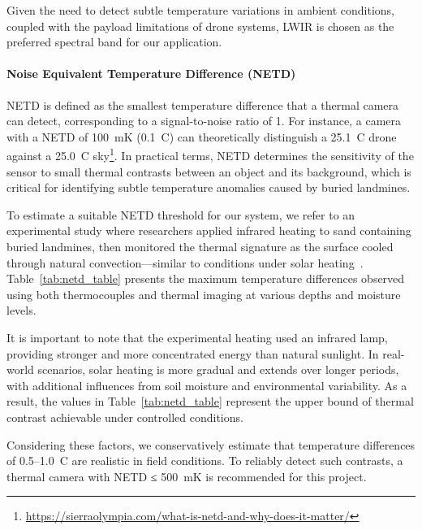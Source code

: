 Given the need to detect subtle temperature variations in ambient conditions, coupled with the payload limitations of drone systems, LWIR is chosen as the preferred spectral band for our application.


\paragraph{Noise Equivalent Temperature Difference (NETD)}

NETD is defined as the smallest temperature difference that a thermal camera can detect, corresponding to a signal-to-noise ratio of 1. For instance, a camera with a NETD of 100~mK (0.1~\textdegree C) can theoretically distinguish a 25.1~\textdegree C drone against a 25.0~\textdegree C sky\footnote{\url{https://sierraolympia.com/what-is-netd-and-why-does-it-matter/}}. In practical terms, NETD determines the sensitivity of the sensor to small thermal contrasts between an object and its background, which is critical for identifying subtle temperature anomalies caused by buried landmines.

To estimate a suitable NETD threshold for our system, we refer to an experimental study where researchers applied infrared heating to sand containing buried landmines, then monitored the thermal signature as the surface cooled through natural convection—similar to conditions under solar heating~\cite{lamorski2002thermal}. Table~\ref{tab:netd_table} presents the maximum temperature differences observed using both thermocouples and thermal imaging at various depths and moisture levels.

It is important to note that the experimental heating used an infrared lamp, providing stronger and more concentrated energy than natural sunlight. In real-world scenarios, solar heating is more gradual and extends over longer periods, with additional influences from soil moisture and environmental variability. As a result, the values in Table~\ref{tab:netd_table} represent the upper bound of thermal contrast achievable under controlled conditions.

Considering these factors, we conservatively estimate that temperature differences of 0.5--1.0~\textdegree C are realistic in field conditions. To reliably detect such contrasts, a thermal camera with NETD ≤ 500~mK is recommended for this project.

